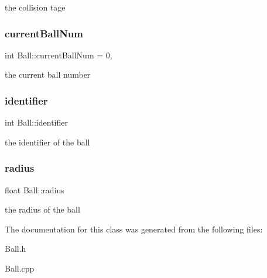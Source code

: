 the collision tage \mbox{\label{class_ball_abfca3451ab889ecc9629e6717a80d099}} 
\subsubsection{\texorpdfstring{current\+Ball\+Num}{currentBallNum}}
{\footnotesize\ttfamily int Ball\+::current\+Ball\+Num = 0\hspace{0.3cm}{\ttfamily [static]}, {\ttfamily [private]}}

the current ball number \mbox{\label{class_ball_a0cc36bfd335b414464d66b2f07935943}} 
\subsubsection{\texorpdfstring{identifier}{identifier}}
{\footnotesize\ttfamily int Ball\+::identifier\hspace{0.3cm}{\ttfamily [private]}}

the identifier of the ball \mbox{\label{class_ball_a86bfb032007c736e06c2295a8070d620}} 
\subsubsection{\texorpdfstring{radius}{radius}}
{\footnotesize\ttfamily float Ball\+::radius\hspace{0.3cm}{\ttfamily [private]}}

the radius of the ball 

The documentation for this class was generated from the following files\+:\begin{DoxyCompactItemize}
\item 
Ball.\+h\item 
Ball.\+cpp\end{DoxyCompactItemize}
